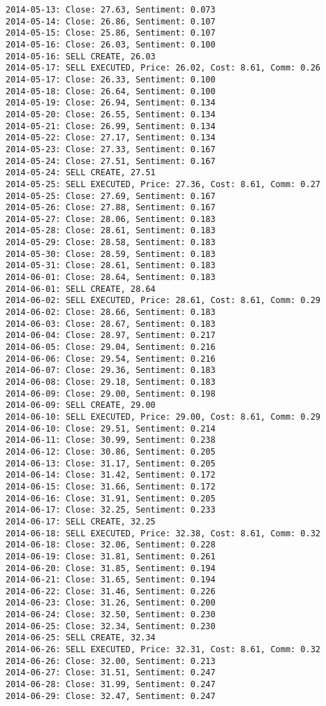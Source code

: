 \documentclass[11pt]{article}
\begin{document}
\begin{Verbatim}[commandchars=\\\{\}]
2014-05-13: Close: 27.63, Sentiment: 0.073
2014-05-14: Close: 26.86, Sentiment: 0.107
2014-05-15: Close: 25.86, Sentiment: 0.107
2014-05-16: Close: 26.03, Sentiment: 0.100
2014-05-16: SELL CREATE, 26.03
2014-05-17: SELL EXECUTED, Price: 26.02, Cost: 8.61, Comm: 0.26
2014-05-17: Close: 26.33, Sentiment: 0.100
2014-05-18: Close: 26.64, Sentiment: 0.100
2014-05-19: Close: 26.94, Sentiment: 0.134
2014-05-20: Close: 26.55, Sentiment: 0.134
2014-05-21: Close: 26.99, Sentiment: 0.134
2014-05-22: Close: 27.17, Sentiment: 0.134
2014-05-23: Close: 27.33, Sentiment: 0.167
2014-05-24: Close: 27.51, Sentiment: 0.167
2014-05-24: SELL CREATE, 27.51
2014-05-25: SELL EXECUTED, Price: 27.36, Cost: 8.61, Comm: 0.27
2014-05-25: Close: 27.69, Sentiment: 0.167
2014-05-26: Close: 27.88, Sentiment: 0.167
2014-05-27: Close: 28.06, Sentiment: 0.183
2014-05-28: Close: 28.61, Sentiment: 0.183
2014-05-29: Close: 28.58, Sentiment: 0.183
2014-05-30: Close: 28.59, Sentiment: 0.183
2014-05-31: Close: 28.61, Sentiment: 0.183
2014-06-01: Close: 28.64, Sentiment: 0.183
2014-06-01: SELL CREATE, 28.64
2014-06-02: SELL EXECUTED, Price: 28.61, Cost: 8.61, Comm: 0.29
2014-06-02: Close: 28.66, Sentiment: 0.183
2014-06-03: Close: 28.67, Sentiment: 0.183
2014-06-04: Close: 28.97, Sentiment: 0.217
2014-06-05: Close: 29.04, Sentiment: 0.216
2014-06-06: Close: 29.54, Sentiment: 0.216
2014-06-07: Close: 29.36, Sentiment: 0.183
2014-06-08: Close: 29.18, Sentiment: 0.183
2014-06-09: Close: 29.00, Sentiment: 0.198
2014-06-09: SELL CREATE, 29.00
2014-06-10: SELL EXECUTED, Price: 29.00, Cost: 8.61, Comm: 0.29
2014-06-10: Close: 29.51, Sentiment: 0.214
2014-06-11: Close: 30.99, Sentiment: 0.238
2014-06-12: Close: 30.86, Sentiment: 0.205
2014-06-13: Close: 31.17, Sentiment: 0.205
2014-06-14: Close: 31.42, Sentiment: 0.172
2014-06-15: Close: 31.66, Sentiment: 0.172
2014-06-16: Close: 31.91, Sentiment: 0.205
2014-06-17: Close: 32.25, Sentiment: 0.233
2014-06-17: SELL CREATE, 32.25
2014-06-18: SELL EXECUTED, Price: 32.38, Cost: 8.61, Comm: 0.32
2014-06-18: Close: 32.06, Sentiment: 0.228
2014-06-19: Close: 31.81, Sentiment: 0.261
2014-06-20: Close: 31.85, Sentiment: 0.194
2014-06-21: Close: 31.65, Sentiment: 0.194
2014-06-22: Close: 31.46, Sentiment: 0.226
2014-06-23: Close: 31.26, Sentiment: 0.200
2014-06-24: Close: 32.50, Sentiment: 0.230
2014-06-25: Close: 32.34, Sentiment: 0.230
2014-06-25: SELL CREATE, 32.34
2014-06-26: SELL EXECUTED, Price: 32.31, Cost: 8.61, Comm: 0.32
2014-06-26: Close: 32.00, Sentiment: 0.213
2014-06-27: Close: 31.51, Sentiment: 0.247
2014-06-28: Close: 31.99, Sentiment: 0.247
2014-06-29: Close: 32.47, Sentiment: 0.247

\end{Verbatim}
\end{document}
